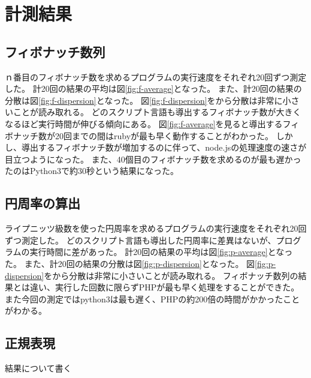 \chapter{計測結果}
\label{cha:result}
\section{フィボナッチ数列}
ｎ番目のフィボナッチ数を求めるプログラムの実行速度をそれぞれ20回ずつ測定した。
計20回の結果の平均は図\ref{fig:f-average}となった。
また、計20回の結果の分散は図\ref{fig:f-dispersion}となった。
図\ref{fig:f-dispersion}をから分散は非常に小さいことが読み取れる。
どのスクリプト言語も導出するフィボナッチ数が大きくなるほど実行時間が伸びる傾向にある。
図\ref{fig:f-average}を見ると導出するフィボナッチ数が20回までの間はrubyが最も早く動作することがわかった。
しかし、導出するフィボナッチ数が増加するのに伴って、node.jsの処理速度の速さが目立つようになった。
また、40個目のフィボナッチ数を求めるのが最も遅かったのはPython3で約30秒という結果になった。

\section{円周率の算出}
ライプニッツ級数を使った円周率を求めるプログラムの実行速度をそれぞれ20回ずつ測定した。
どのスクリプト言語も導出した円周率に差異はないが、プログラムの実行時間に差があった。
計20回の結果の平均は図\ref{fig:p-average}となった。
また、計20回の結果の分散は図\ref{fig:p-dispersion}となった。
図\ref{fig:p-dispersion}をから分散は非常に小さいことが読み取れる。
フィボナッチ数列の結果とは違い、実行した回数に限らずPHPが最も早く処理をすることができた。
また今回の測定ではpython3は最も遅く、PHPの約200倍の時間がかかったことがわかる。

\section{正規表現}
結果について書く

\clearpage
{}
\clearpage
{}
\clearpage
{}

